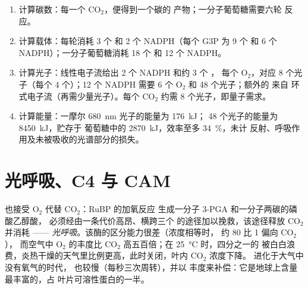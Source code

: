 \begin{method}[光合作用收支核算]\label{met:b1:photosynthesis:budget}
\begin{enumerate}
  \item 计算碳数：每一个 $\mathrm{CO_2}$，便得到一个碳的
        产物；一分子葡萄糖需要六轮  反应。
  \item 计算载体：每轮消耗 3 个  和 2 个 NADPH（每个 G3P 为
        9 个  和 6 个 NADPH）；一分子葡萄糖消耗 18 个  和 12 个 NADPH。
  \item 计算光子：线性电子流给出 2 个 NADPH 和约 3 个 ，
        每个 $\mathrm{O_2}$，对应 8 个光子（每个 4 个）；12 个 NADPH
        需要 6 个 $\mathrm{O_2}$ 和 48 个光子；额外的  来自
        环式电子流（再需少量光子）。每个
        $\mathrm{CO_2}$ 约需 8 个光子，即量子需求。
  \item 计算能量：一摩尔 \qty{680}{nm} 光子的能量为 \qty{176}{kJ}；
        48 个光子的能量为 \qty{8450}{kJ}，贮存于
        葡萄糖中的 \qty{2870}{kJ}，效率至多 \qty{34}{\%}，未计
        反射、呼吸作用及未被吸收的光谱部分的损失。
\end{enumerate}
\end{method}

\section{光呼吸、C4 与 CAM}

\begin{proposition}\label{prop:b1:photosynthesis:photorespiration}
 也接受 $\mathrm{O_2}$ 代替 $\mathrm{CO_2}$：RuBP 的加氧反应
生成一分子 3-PGA 和一分子两碳的磷酸乙醇酸，
必须经由一条代价高昂、横跨三个
的途径加以挽救，该途径释放 $\mathrm{CO_2}$ 并消耗 ——
\emph{光呼吸}。该酶的区分能力很差（浓度相等时，
约 \qty{80}{} 比 1 偏向 $\mathrm{CO_2}$），
而空气中 $\mathrm{O_2}$ 的丰度比
$\mathrm{CO_2}$ 高五百倍；在 \qty{25}{\celsius} 时，四分之一的
被白白浪费，炎热干燥的天气里比例更高，此时关闭，叶内
$\mathrm{CO_2}$ 浓度下降。 进化于大气中没有氧气的时代，
也较慢（每秒三次周转），并以
丰度来补偿：它是地球上含量最丰富的，占
叶片可溶性蛋白的一半。
\end{proposition}


